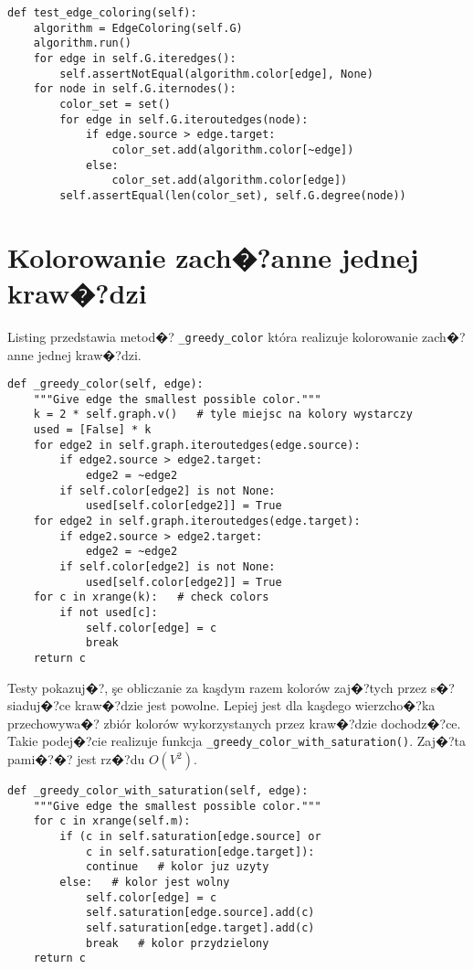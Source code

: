 \documentclass[12pt,a4paper]{mwrep}
\begin{document}
\begin{lstlisting}[caption={Test poprawno�?ci kolorowania kraw�?dzi.},
label={lst:proper_edge_coloring}]
def test_edge_coloring(self):
    algorithm = EdgeColoring(self.G)
    algorithm.run()
    for edge in self.G.iteredges():
        self.assertNotEqual(algorithm.color[edge], None)
    for node in self.G.iternodes():
        color_set = set()
        for edge in self.G.iteroutedges(node):
            if edge.source > edge.target:
                color_set.add(algorithm.color[~edge])
            else:
                color_set.add(algorithm.color[edge])
        self.assertEqual(len(color_set), self.G.degree(node))
\end{lstlisting}

\section{Kolorowanie zach�?anne jednej kraw�?dzi}
\label{sec:greedy_edge_coloring}

Listing przedstawia metod�? \lstinline|_greedy_color|
która realizuje kolorowanie zach�?anne jednej kraw�?dzi.

\begin{lstlisting}[caption={Kolorowanie zach�?anne jednej kraw�?dzi.},
label={lst:greedy_color_edge}]
def _greedy_color(self, edge):
    """Give edge the smallest possible color."""
    k = 2 * self.graph.v()   # tyle miejsc na kolory wystarczy
    used = [False] * k
    for edge2 in self.graph.iteroutedges(edge.source):
        if edge2.source > edge2.target:
            edge2 = ~edge2
        if self.color[edge2] is not None:
            used[self.color[edge2]] = True
    for edge2 in self.graph.iteroutedges(edge.target):
        if edge2.source > edge2.target:
            edge2 = ~edge2
        if self.color[edge2] is not None:
            used[self.color[edge2]] = True
    for c in xrange(k):   # check colors
        if not used[c]:
            self.color[edge] = c
            break
    return c
\end{lstlisting}

Testy pokazuj�?, şe obliczanie za kaşdym razem kolorów zaj�?tych
przez s�?siaduj�?ce kraw�?dzie jest powolne.
Lepiej jest dla kaşdego wierzcho�?ka przechowywa�? zbiór kolorów
wykorzystanych przez kraw�?dzie dochodz�?ce. Takie podej�?cie realizuje
funkcja \lstinline|_greedy_color_with_saturation()|.
Zaj�?ta pami�?�? jest rz�?du $O(V^2)$.

\begin{lstlisting}[caption={Kolorowanie jednej kraw�?dzi z saturacj�?.},
label={lst:saturated_color_edge}]
def _greedy_color_with_saturation(self, edge):
    """Give edge the smallest possible color."""
    for c in xrange(self.m):
        if (c in self.saturation[edge.source] or 
            c in self.saturation[edge.target]):
            continue   # kolor juz uzyty
        else:   # kolor jest wolny
            self.color[edge] = c
            self.saturation[edge.source].add(c)
            self.saturation[edge.target].add(c)
            break   # kolor przydzielony
    return c
\end{lstlisting}
\end{document}
